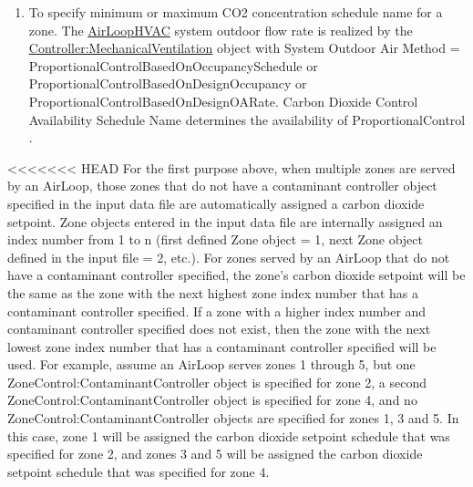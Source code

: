\begin{enumerate}
>>>>>>> nrel/develop
\item
  To specify minimum or maximum CO2 concentration schedule name for a zone. The \hyperref[airloophvac]{AirLoopHVAC} system outdoor flow rate is realized by the \hyperref[controllermechanicalventilation]{Controller:MechanicalVentilation} object with System Outdoor Air Method = ProportionalControlBasedOnOccupancySchedule or ProportionalControlBasedOnDesignOccupancy or ProportionalControlBasedOnDesignOARate. Carbon Dioxide Control Availability Schedule Name determines the availability of ProportionalControl .
\end{enumerate}

<<<<<<< HEAD
For the first purpose above, when multiple zones are served by an AirLoop, those zones that do not have a contaminant controller object specified in the input data file are automatically assigned a carbon dioxide setpoint. Zone objects entered in the input data file are internally assigned an index number from 1 to n (first defined Zone object = 1, next Zone object defined in the input file = 2, etc.). For zones served by an AirLoop that do not have a contaminant controller specified, the zone's carbon dioxide setpoint will be the same as the zone with the next highest zone index number that has a contaminant controller specified. If a zone with a higher index number and contaminant controller specified does not exist, then the zone with the next lowest zone index number that has a contaminant controller specified will be used. For example, assume an AirLoop serves zones 1 through 5, but one ZoneControl:ContaminantController object is specified for zone 2, a second ZoneControl:ContaminantController object is specified for zone 4, and no ZoneControl:ContaminantController objects are specified for zones 1, 3 and 5. In this case, zone 1 will be assigned the carbon dioxide setpoint schedule that was specified for zone 2, and zones 3 and 5 will be assigned the carbon dioxide setpoint schedule that was specified for zone 4.

